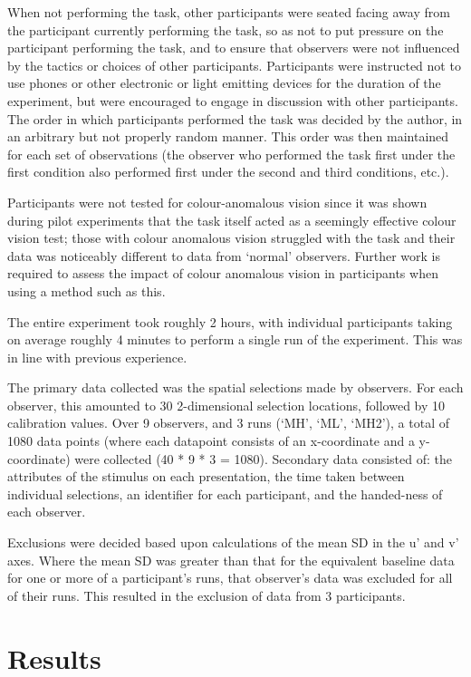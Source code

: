 When not performing the task, other participants were seated facing away from the participant currently performing the task, so as not to put pressure on the participant performing the task, and to ensure that observers were not influenced by the tactics or choices of other participants. Participants were instructed not to use phones or other electronic or light emitting devices for the duration of the experiment, but were encouraged to engage in discussion with other participants. The order in which participants performed the task was decided by the author, in an arbitrary but not properly random manner. This order was then maintained for each set of observations (the observer who performed the task first under the first condition also performed first under the second and third conditions, etc.).

Participants were not tested for colour-anomalous vision since it was shown during pilot experiments that the task itself acted as a seemingly effective colour vision test; those with colour anomalous vision struggled with the task and their data was noticeably different to data from `normal' observers. Further work is required to assess the impact of colour anomalous vision in participants when using a method such as this. 

The entire experiment took roughly 2 hours, with individual participants taking on average roughly 4 minutes to perform a single run of the experiment. This was in line with previous experience.

The primary data collected was the spatial selections made by observers. For each observer, this amounted to 30 2-dimensional selection locations, followed by 10 calibration values. Over 9 observers, and 3 runs (`MH', `ML', `MH2'), a total of 1080 data points (where each datapoint consists of an x-coordinate and a y-coordinate) were collected (40 * 9 * 3 = 1080). Secondary data consisted of: the attributes of the stimulus on each presentation, the time taken between individual selections, an identifier for each participant, and the handed-ness of each observer.

Exclusions were decided based upon calculations of the mean SD in the u' and v' axes. Where the mean SD was greater than that for the equivalent baseline data for one or more of a participant's runs, that observer's data was excluded for all of their runs. This resulted in the exclusion of data from 3 participants.


\section{Results}

